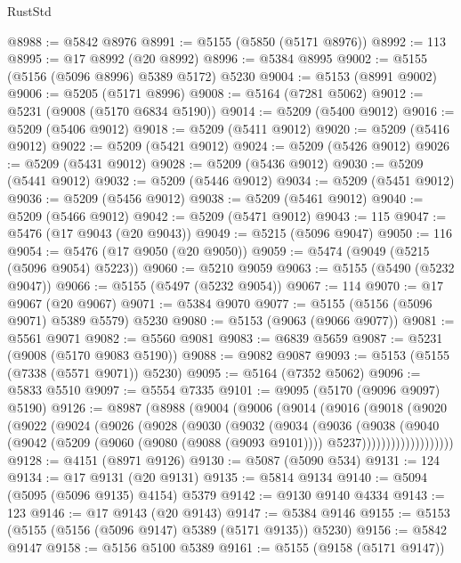 \begin{lexlean}{RustStd}
\begin{coremodule}
@8988 := @5842 @8976
@8991 := @5155 (@5850 (@5171 @8976))
@8992 := 113
@8995 := @17 @8992 (@20 @8992)
@8996 := @5384 @8995
@9002 := @5155 (@5156 (@5096 @8996) @5389 @5172) @5230
@9004 := @5153 (@8991 @9002)
@9006 := @5205 (@5171 @8996)
@9008 := @5164 (@7281 @5062)
@9012 := @5231 (@9008 (@5170 @6834 @5190))
@9014 := @5209 (@5400 @9012)
@9016 := @5209 (@5406 @9012)
@9018 := @5209 (@5411 @9012)
@9020 := @5209 (@5416 @9012)
@9022 := @5209 (@5421 @9012)
@9024 := @5209 (@5426 @9012)
@9026 := @5209 (@5431 @9012)
@9028 := @5209 (@5436 @9012)
@9030 := @5209 (@5441 @9012)
@9032 := @5209 (@5446 @9012)
@9034 := @5209 (@5451 @9012)
@9036 := @5209 (@5456 @9012)
@9038 := @5209 (@5461 @9012)
@9040 := @5209 (@5466 @9012)
@9042 := @5209 (@5471 @9012)
@9043 := 115
@9047 := @5476 (@17 @9043 (@20 @9043))
@9049 := @5215 (@5096 @9047)
@9050 := 116
@9054 := @5476 (@17 @9050 (@20 @9050))
@9059 := @5474 (@9049 (@5215 (@5096 @9054) @5223))
@9060 := @5210 @9059
@9063 := @5155 (@5490 (@5232 @9047))
@9066 := @5155 (@5497 (@5232 @9054))
@9067 := 114
@9070 := @17 @9067 (@20 @9067)
@9071 := @5384 @9070
@9077 := @5155 (@5156 (@5096 @9071) @5389 @5579) @5230
@9080 := @5153 (@9063 (@9066 @9077))
@9081 := @5561 @9071
@9082 := @5560 @9081
@9083 := @6839 @5659
@9087 := @5231 (@9008 (@5170 @9083 @5190))
@9088 := @9082 @9087
@9093 := @5153 (@5155 (@7338 (@5571 @9071)) @5230)
@9095 := @5164 (@7352 @5062)
@9096 := @5833 @5510
@9097 := @5554 @7335
@9101 := @9095 (@5170 (@9096 @9097) @5190)
@9126 := @8987
    (@8988
      (@9004
        (@9006
          (@9014
            (@9016
              (@9018
                (@9020
                  (@9022
                    (@9024
                      (@9026
                        (@9028
                          (@9030
                            (@9032
                              (@9034
                                (@9036
                                  (@9038
                                    (@9040
                                      (@9042
                                        (@5209
                                          (@9060 (@9080 (@9088 (@9093 @9101))))
                                          @5237)))))))))))))))))))
@9128 := @4151 (@8971 @9126)
@9130 := @5087 (@5090 @534)
@9131 := 124
@9134 := @17 @9131 (@20 @9131)
@9135 := @5814 @9134
@9140 := @5094 (@5095 (@5096 @9135) @4154) @5379
@9142 := @9130 @9140 @4334
@9143 := 123
@9146 := @17 @9143 (@20 @9143)
@9147 := @5384 @9146
@9155 := @5153 (@5155 (@5156 (@5096 @9147) @5389 (@5171 @9135)) @5230)
@9156 := @5842 @9147
@9158 := @5156 @5100 @5389
@9161 := @5155 (@9158 (@5171 @9147))

\end{coremodule}
\end{lexlean}
